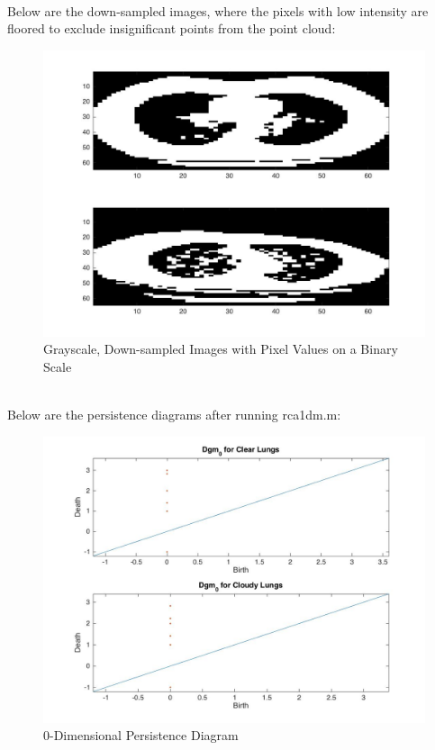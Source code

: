 \documentclass[12pt]{report}
\begin{document}
\\
Below are the down-sampled images, where the pixels with low intensity are floored to exclude insignificant points from the point cloud:
\\
\begin{figure}[H]
\centering
	\includegraphics[width=0.8\linewidth]{tS2.jpg}
	\caption{Grayscale, Down-sampled Images with Pixel Values on a Binary Scale}
\end{figure}\newline
\\
Below are the persistence diagrams after running rca1dm.m:
\\
\begin{figure}[H]
\centering
	\includegraphics[width=0.8\linewidth]{tSdgm0.jpg}
	\caption{0-Dimensional Persistence Diagram}
\end{figure}\newline
\\
\end{document}
